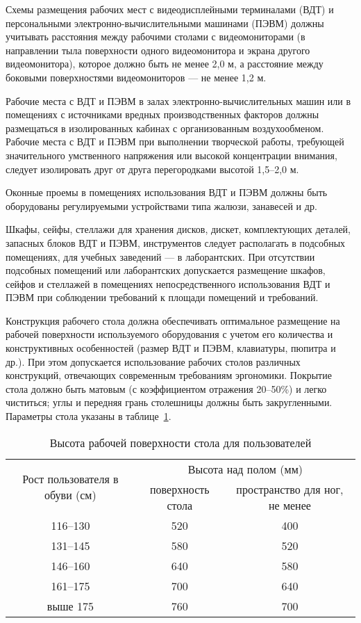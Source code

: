 Схемы размещения рабочих мест с видеодисплейными терминалами (ВДТ) и персональными электронно-вычислительными машинами (ПЭВМ) должны учитывать расстояния между рабочими столами с видеомониторами (в направлении тыла поверхности одного видеомонитора и экрана другого видеомонитора), которое должно быть не менее 2,0 м, а расстояние между боковыми поверхностями видеомониторов --- не менее 1,2 м.

Рабочие места с ВДТ и ПЭВМ в залах электронно-вычислительных машин или в помещениях с источниками вредных производственных факторов должны размещаться в изолированных кабинах с организованным воздухообменом. Рабочие места с ВДТ и ПЭВМ при выполнении творческой работы, требующей значительного умственного напряжения или высокой концентрации внимания, следует изолировать друг от друга перегородками высотой 1,5--2,0 м.

Оконные проемы в помещениях использования ВДТ и ПЭВМ должны быть оборудованы регулируемыми устройствами типа жалюзи, занавесей и др.

Шкафы, сейфы, стеллажи для хранения дисков, дискет, комплектующих деталей, запасных блоков ВДТ и ПЭВМ, инструментов следует располагать в подсобных помещениях, для учебных заведений --- в лаборантских. При отсутствии подсобных помещений или лаборантских допускается размещение шкафов, сейфов и стеллажей в помещениях непосредственного использования ВДТ и ПЭВМ при соблюдении требований к площади помещений и требований.

Конструкция рабочего стола должна обеспечивать оптимальное размещение на рабочей поверхности используемого оборудования с учетом его количества и конструктивных особенностей (размер ВДТ и ПЭВМ, клавиатуры, пюпитра и др.). При этом допускается использование рабочих столов различных конструкций, отвечающих современным требованиям эргономики. Покрытие стола должно быть матовым (с коэффициентом отражения 20--50\%) и легко чиститься; углы и передняя грань столешницы должны быть закругленными. Параметры стола указаны в таблице~\ref{tab:table_height}.
\begin{table}\begin{center}
\begin{tabular}{|c|c|c|}
\hline
\multirow{3}{2.5cm}{Рост пользователя в обуви (см)}
& \multicolumn{2}{|c|}{Высота над полом (мм)} \\
\cline{2-3}
&\multirow{2}{2.5cm}{поверхность стола}&\multirow{2}{4cm}{пространство для ног, не менее}\\
&&\\
\hline
116--130 & 520 & 400 \\
\hline
131--145 & 580 & 520 \\
\hline
146--160 & 640 & 580 \\
\hline
161--175 & 700 & 640 \\
\hline
выше 175 & 760 & 700 \\
\hline
\end{tabular}
\caption{Высота рабочей поверхности стола для пользователей}
\label{tab:table_height}
\end{center}\end{table}

